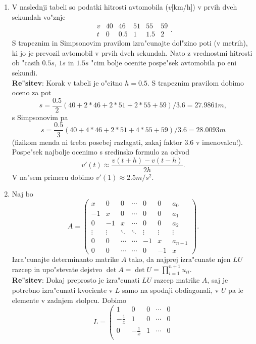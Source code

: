 \documentclass[12pt,a4paper]{article}
\begin{document}
\begin{enumerate}
  \item V naslednji tabeli so podatki hitrosti avtomobila ($v$[km/h])
    v prvih dveh sekundah vo"znje
    $$\begin{array}{l|rrrrr}
    v & 40 & 46 & 51 & 55 & 59\\ \hline
    t & 0  & 0.5 & 1 & 1.5 & 2
    \end{array}.$$
    S trapeznim in Simpsonovim pravilom izra"cunajte dol"zino poti 
    (v me\-trih), ki jo je prevozil avtomobil v prvih dveh sekundah. Nato 
    z vrednostmi hitrosti ob "casih $0.5s$, $1s$ in $1.5s$ "cim bolje ocenite
    pospe"sek avtomobila po eni sekundi.\\
    {\bf Re"sitev}: Korak v tabeli je o"citno $h=0.5$. S trapeznim pravilom
    dobimo oceno za pot
    $$s=\frac{0.5}{2}(40+2*46+2*51+2*55+59)/3.6=27.9861m,$$
    s Simpsonovim pa
    $$s=\frac{0.5}{3}(40+4*46+2*51+4*55+59)/3.6=28.0093m$$
    (fizikom menda ni treba posebej razlagati, 
    zakaj faktor $3.6$ v imenovalcu!).
    Pospe"sek najbolje ocenimo s sredinsko formulo za odvod
    $$v'(t)\approx \frac{v(t+h)-v(t-h)}{2h}.$$
    V na"sem primeru dobimo $v'(1)\approx 2.5m/s^2$.
  \item Naj bo 
    $$A=\left(
      \begin{array}{ccccccc}
        x & 0 & 0 & \cdots & 0 & 0 & a_0\\
        -1& x & 0 & \cdots & 0 & 0 & a_1\\
        0 & -1& x & \cdots & 0 & 0 & a_2\\
        \vdots & \vdots & \ddots & \ddots & \vdots & \vdots & \vdots\\
        0 & 0 & \cdots & \cdots & -1 & x & a_{n-1}\\
        0 & 0 & \cdots & \cdots & 0 & -1 & x
      \end{array}\right) .
    $$
      Izra"cunajte determinanto matrike $A$ tako, da najprej
      izra"cunate njen $LU$ razcep in upo"stevate dejstvo
      $\det A=\det U=\prod_{i=1}^{n+1}u_{ii}$.\\
    {\bf Re"sitev}: Dokaj preprosto je izra"cunati $LU$ razcep
    matrike $A$, saj je potrebno izra"cunati kvociente v $L$
    samo na spodnji obdiagonali, v $U$ pa le elemente v zadnjem
    stolpcu. Dobimo
    $$L=\left(
      \begin{array}{rrrrr}
        1 & 0 & 0 & \cdots & 0\\
        -\frac{1}{x} & 1 & 0 & \cdots &0\\
        0 & -\frac{1}{x} & 1 & \cdots &0\\

\end{array}$$
\end{enumerate}
\end{document}
